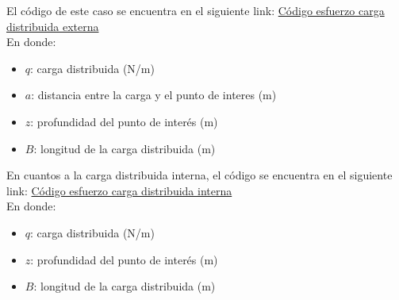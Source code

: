 \documentclass{article} %
\begin{document}
El código de este caso se encuentra en el siguiente link: \href{https://github.com/berckanala/Fundaciones_P2/blob/main/Codigos/python/esfuerzo_distribuida_externa.py}{Código esfuerzo carga distribuida externa}\\
En donde:
\begin{itemize}
    \item $q$: carga distribuida (N/m)
    \item $a$: distancia entre la carga y el punto de interes (m)
    \item $z$: profundidad del punto de interés (m)
    \item $B$: longitud de la carga distribuida (m)
\end{itemize}
En cuantos a la carga distribuida interna, el código se encuentra en el siguiente link: \href{https://github.com/berckanala/Fundaciones_P2/blob/main/Codigos/python/esfuerzo_distribuido_interna.py}{Código esfuerzo carga distribuida interna}\\
En donde:
\begin{itemize}
    \item $q$: carga distribuida (N/m)
    \item $z$: profundidad del punto de interés (m)
    \item $B$: longitud de la carga distribuida (m)
\end{itemize}
\end{document}

